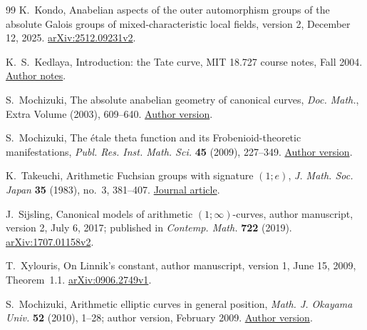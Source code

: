 \documentclass[11pt]{amsart}
\theoremstyle{definition}
\theoremstyle{remark}
\begin{document}
\begin{thebibliography}{99}
K.~Kondo, Anabelian aspects of the outer automorphism groups of the
absolute Galois groups of mixed-characteristic local fields,
version 2, December 12, 2025.
\href{https://arxiv.org/abs/2512.09231v2}{arXiv:2512.09231v2}.

K.~S.~Kedlaya, Introduction: the Tate curve,
MIT 18.727 course notes, Fall 2004.
\href{https://kskedlaya.org/18.727/tate-curve.pdf}{Author notes}.

S.~Mochizuki, The absolute anabelian geometry of canonical curves,
\emph{Doc. Math.}, Extra Volume (2003), 609--640.
\href{https://www.kurims.kyoto-u.ac.jp/~motizuki/Canonical\%20Liftings.pdf}{Author version}.

S.~Mochizuki, The \'etale theta function and its Frobenioid-theoretic
manifestations,
\emph{Publ. Res. Inst. Math. Sci.} \textbf{45} (2009), 227--349.
\href{https://www.kurims.kyoto-u.ac.jp/~motizuki/The\%20Etale\%20Theta\%20Function\%20and\%20its\%20Frobenioid-theoretic\%20Manifestations.pdf}{Author version}.

K.~Takeuchi, Arithmetic Fuchsian groups with signature $(1;e)$,
\emph{J. Math. Soc. Japan} \textbf{35} (1983), no.~3, 381--407.
\href{https://www.jstage.jst.go.jp/article/jmath1948/35/3/35_3_381/_pdf/-char/en}{Journal article}.

J.~Sijsling, Canonical models of arithmetic $(1;\infty)$-curves,
author manuscript, version 2, July 6, 2017;
published in \emph{Contemp. Math.} \textbf{722} (2019).
\href{https://arxiv.org/abs/1707.01158v2}{arXiv:1707.01158v2}.

T.~Xylouris, On Linnik's constant,
author manuscript, version 1, June 15, 2009, Theorem~1.1.
\href{https://arxiv.org/abs/0906.2749v1}{arXiv:0906.2749v1}.

S.~Mochizuki, Arithmetic elliptic curves in general position,
\emph{Math. J. Okayama Univ.} \textbf{52} (2010), 1--28;
author version, February 2009.
\href{https://www.kurims.kyoto-u.ac.jp/~motizuki/Arithmetic\%20Elliptic\%20Curves\%20in\%20General\%20Position.pdf}{Author version}.

\end{thebibliography}
\end{document}
